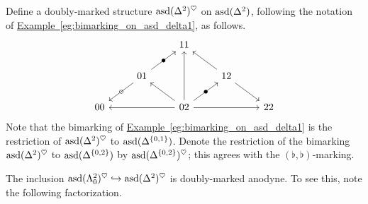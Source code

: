 \documentclass[main.tex]{subfiles}
\begin{document}
\begin{example}
  \label{eg:bimarking_on_asd_delta2}
  Define a doubly-marked structure $\mathrm{asd}(\Delta^{2})^{\heartsuit}$ on $\mathrm{asd}(\Delta^{2})$, following the notation of \hyperref[eg:bimarking_on_asd_delta1]{Example~\ref*{eg:bimarking_on_asd_delta1}}, as follows.
  \begin{equation*}
    \begin{tikzcd}
      && 11
      \\
      & 01
      \arrow[ur, "\bullet" marking]
      \arrow[dl, "\circ" marking]
      && 12
      \arrow[ul]
      \arrow[dr]
      \\
      00
      && 02
      \arrow[ll]
      \arrow[rr]
      \arrow[uu]
      \arrow[ur, "\bullet" marking]
      \arrow[ul]
      && 22
    \end{tikzcd}
  \end{equation*}
  Note that the bimarking of \hyperref[eg:bimarking_on_asd_delta1]{Example~\ref*{eg:bimarking_on_asd_delta1}} is the restriction of $\mathrm{asd}(\Delta^{2})^{\heartsuit}$ to $\mathrm{asd}(\Delta^{\{0, 1\}})$. Denote the restriction of the bimarking $\mathrm{asd}(\Delta^{2})^{\heartsuit}$ to $\mathrm{asd}(\Delta^{\{0, 2\}})$ by $\mathrm{asd}(\Delta^{\{0, 2\}})^{\heartsuit}$; this agrees with the $(\flat,\flat)$-marking.

  The inclusion $\mathrm{asd}(\Lambda^{2}_{0})^{\heartsuit} \hookrightarrow \mathrm{asd}(\Delta^{2})^{\heartsuit}$ is doubly-marked anodyne. To see this, note the following factorization.
\end{example}
\end{document}
